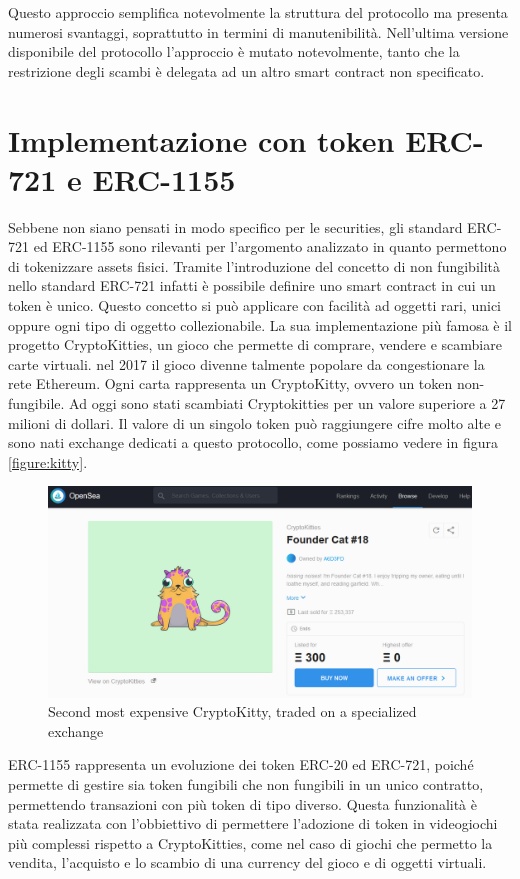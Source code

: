 Questo approccio semplifica notevolmente la struttura del protocollo ma presenta numerosi svantaggi, soprattutto in termini di manutenibilità. Nell'ultima versione disponibile del protocollo l'approccio è mutato notevolmente, tanto che la restrizione degli scambi è delegata ad un altro smart contract non specificato. 
\section{Implementazione con token ERC-721 e ERC-1155}
Sebbene non siano pensati in modo specifico per le securities, gli standard ERC-721 ed ERC-1155 sono rilevanti per l'argomento analizzato in quanto permettono di tokenizzare assets fisici. Tramite l'introduzione del concetto di non fungibilità nello standard ERC-721 infatti è possibile definire uno smart contract in cui un token è unico. Questo concetto si può applicare con facilità ad oggetti rari, unici oppure ogni tipo di oggetto collezionabile. La sua implementazione più famosa è il progetto CryptoKitties, un gioco che permette di comprare, vendere e scambiare carte virtuali. nel 2017 il gioco divenne talmente popolare da congestionare la rete Ethereum. Ogni carta rappresenta un CryptoKitty, ovvero un token  non-fungibile. Ad oggi sono stati scambiati Cryptokitties per un valore superiore a 27 milioni di dollari. Il valore di un singolo token può raggiungere cifre molto alte e sono nati exchange dedicati a questo protocollo, come possiamo vedere in figura \ref{figure:kitty}.
\begin{figure}[H]
  \includegraphics[width=\linewidth]{kitty.png}
  \caption{Second most expensive CryptoKitty, traded on a specialized exchange}
  \label{fig:kitty}
\end{figure}
ERC-1155 rappresenta un evoluzione dei token ERC-20 ed ERC-721, poiché permette di gestire sia token fungibili che non fungibili in un unico contratto, permettendo transazioni con più token di tipo diverso. Questa funzionalità è stata realizzata con l'obbiettivo di permettere l'adozione di token in videogiochi più complessi rispetto a CryptoKitties, come nel caso di giochi che permetto la vendita, l'acquisto e lo scambio di una currency del gioco e di oggetti virtuali. 

